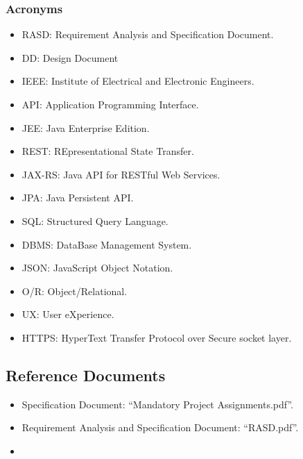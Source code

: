 \subsubsection{Acronyms}
\begin{itemize}
\renewcommand\labelitemi{-}
\item
RASD: Requirement Analysis and Specification Document.
\item
DD: Design Document
\item
IEEE: Institute of Electrical and Electronic Engineers.
\item
API: Application Programming Interface.
\item
JEE: Java Enterprise Edition.
\item
REST: REpresentational State Transfer.
\item
JAX-RS: Java API for RESTful Web Services.
\item
JPA: Java Persistent API.
\item
SQL: Structured Query Language.
\item
DBMS: DataBase Management System.
\item
JSON: JavaScript Object Notation.
\item
O/R: Object/Relational.
\item
UX: User eXperience.
\item
HTTPS: HyperText Transfer Protocol over Secure socket layer.
\end{itemize}

\subsection{Reference Documents}
\begin{itemize}
\renewcommand\labelitemi{-}
\item
Specification Document: “Mandatory Project Assignments.pdf”.
\item
Requirement Analysis and Specification Document: “RASD.pdf”.
\item
\href{http://ieeexplore.ieee.org/document/5167255/}{\color{Black}{IEEE 1016-2009 - IEEE Standard for Information Technology--Systems Design--Software Design Descriptions.}}
\end{itemize}


